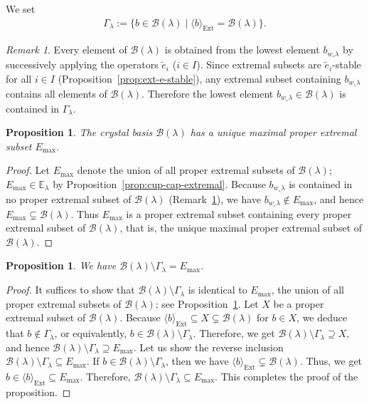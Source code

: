 \documentclass[reqno]{amsart}
\newtheorem{proposition}[theorem]{Proposition}
\theoremstyle{definition}
\theoremstyle{remark}
\newtheorem{remark}[theorem]{Remark}
\numberwithin{equation}{section}
\newcommand{\B}{\mathcal{B}}
\newcommand{\Ext}{\operatorname{Ext}}
\newcommand{\Gl}{\Gamma_\lambda}
\newcommand{\te}{\tilde e}
\newcommand{\Bl}{\B(\lambda)}
\begin{document}
	We set
	\begin{align}\label{eq:Gl}
		\Gl:=\{b\in\Bl\mid \langle b\rangle_{\Ext}=\Bl\}.
	\end{align}
	
	\begin{remark}\label{rem:bwo-in-Gl}
		Every element of $\Bl$ is obtained from the lowest element $b_{w_\circ\lambda}$ by successively applying
		the operators $\te_i$ ($i\in I$).
		Since extremal subsets are $\te_i$-stable for all $i\in I$ (Proposition~\ref{prop:ext-e-stable}),
		any extremal subset containing $b_{w_\circ\lambda}$ contains all elements of $\Bl$.
		Therefore the lowest element $b_{w_\circ\lambda}\in\Bl$ is contained in $\Gl$.
	\end{remark}

    \begin{proposition}\label{prop:Emaxexists}
        The crystal basis $\Bl$ has a unique maximal proper extremal subset $E_{\max}$.
    \end{proposition}
    \begin{proof}
        Let $E_{\max}$ denote the union of all proper extremal subsets of $\Bl$; 
        $E_{\max}\in\mathbb{E}_\lambda$ by Proposition~\ref{prop:cup-cap-extremal}.
        Because $b_{w_\circ\lambda}$ is contained in no proper extremal subset of $\Bl$ (Remark~\ref{rem:bwo-in-Gl}),
        we have $b_{w_\circ\lambda}\notin E_{\max}$, and hence $E_{\max}\subsetneq\Bl$.
        Thus $E_{\max}$ is a proper extremal subset containing every proper extremal subset of $\Bl$,
        that is, the unique maximal proper extremal subset of $\Bl$.
    \end{proof}

	\begin{proposition}\label{prop:max-proper-extremal}
		We have $\Bl\setminus\Gl=E_{\max}$.
	\end{proposition}
	\begin{proof}
        It suffices to show that $\Bl\setminus\Gl$ is identical to $E_{\max}$, the union of all proper extremal subsets of $\Bl$;
		see Proposition~\ref{prop:Emaxexists}.
		Let $X$ be a proper extremal subset of $\Bl$.
		Because $\langle b\rangle_{\Ext}\subseteq X\subsetneq \Bl$ for $b\in X$, we deduce that $b\notin \Gl$, or equivalently,
		$b\in \Bl\setminus\Gl$.
		Therefore, we get $\Bl\setminus\Gl\supseteq X$,
		and hence $\Bl\setminus\Gl\supseteq E_{\max}$.
		Let us show the reverse inclusion $\Bl\setminus\Gl\subseteq E_{\max}$.
		If $b\in\Bl\setminus\Gl$,
		then we have $\langle b\rangle_{\Ext}\subsetneq \Bl$.
		Thus, we get $b\in\langle b\rangle_{\Ext}\subseteq E_{\max}$.
		Therefore, $\Bl\setminus\Gl\subseteq E_{\max}$.
		This completes the proof of the proposition.
	\end{proof}
	
\end{document}
